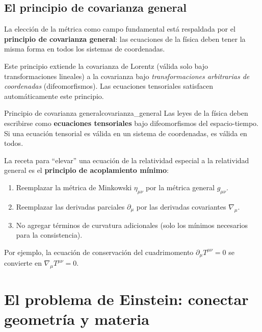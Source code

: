 \subsection{El principio de covarianza general}

La elección de la métrica como campo fundamental está respaldada por el \textbf{principio de covarianza general}: las ecuaciones de la física deben tener la misma forma en todos los sistemas de coordenadas.

Este principio extiende la covarianza de Lorentz (válida solo bajo transformaciones lineales) a la covarianza bajo \emph{transformaciones arbitrarias de coordenadas} (difeomorfismos). Las ecuaciones tensoriales satisfacen automáticamente este principio.

\begin{definicion}{Principio de covarianza general}{covarianza_general}
Las leyes de la física deben escribirse como \textbf{ecuaciones tensoriales} bajo difeomorfismos del espacio-tiempo. Si una ecuación tensorial es válida en un sistema de coordenadas, es válida en todos.
\end{definicion}

\begin{importante}
La receta para ``elevar'' una ecuación de la relatividad especial a la relatividad general es el \textbf{principio de acoplamiento mínimo}:
\begin{enumerate}[leftmargin=2em]
  \item Reemplazar la métrica de Minkowski $\eta_{\mu\nu}$ por la métrica general $g_{\mu\nu}$.
  \item Reemplazar las derivadas parciales $\partial_\mu$ por las derivadas covariantes $\nabla_\mu$.
  \item No agregar términos de curvatura adicionales (solo los mínimos necesarios para la consistencia).
\end{enumerate}
Por ejemplo, la ecuación de conservación del cuadrimomento $\partial_\mu T^{\mu\nu} = 0$ se convierte en $\nabla_\mu T^{\mu\nu} = 0$.
\end{importante}

\section{El problema de Einstein: conectar geometría y materia}
\label{sec:problema_einstein}

